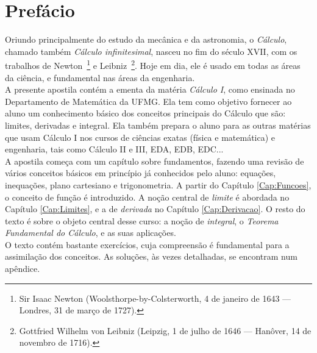 

\chapter{Prefácio}

Oriundo principalmente do estudo da mecânica e da astronomia, o 
\emph{Cálculo}, 
chamado também \emph{Cálculo infinitesimal}, nasceu no fim do século
XVII, com os trabalhos de Newton~\footnote{Sir Isaac Newton
(Woolsthorpe-by-Colsterworth, 4 de janeiro de 1643 — Londres, 31 de 
março de
1727).} e Leibniz~\footnote{Gottfried Wilhelm von Leibniz (Leipzig, 1 
de julho
de 1646 — Hanôver, 14 de novembro de 1716).}. Hoje em dia, ele é usado 
em todas
as áreas da ciência, e fundamental nas áreas da 
engenharia.\\

A presente apostila contém a ementa da matéria \emph{Cálculo I}, como 
ensinada 
no Departamento de Matemática da UFMG.
Ela tem como objetivo fornecer ao aluno um conhecimento básico dos 
conceitos 
principais do Cálculo que são: limites, derivadas e integral. Ela também 
prepara
o aluno para as outras matérias que usam Cálculo I nos cursos de 
ciências exatas
(física e matemática) e engenharia, 
tais como Cálculo II e III, EDA, EDB, EDC...\\

A apostila começa com um capítulo sobre fundamentos, fazendo uma revisão 
de 
vários conceitos básicos em princípio já conhecidos pelo aluno: equações,
inequações, plano cartesiano e trigonometria. A partir do Capítulo
\ref{Cap:Funcoes}, o conceito de função é introduzido. A noção central de
\emph{limite} é abordada no Capítulo \ref{Cap:Limites}, e a de 
\emph{derivada}
no Capítulo \ref{Cap:Derivacao}. O resto do texto é sobre o objeto 
central desse
curso: a noção de \emph{integral}, o \emph{Teorema Fundamental do 
Cálculo}, e
as suas aplicações.\\

O texto contém bastante exercícios, cuja compreensão é fundamental para a 
assimilação dos conceitos.
As soluções, às vezes detalhadas, se encontram num apêndice.\\


